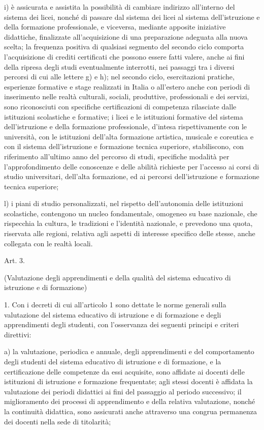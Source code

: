 i) è assicurata e assistita la possibilità di cambiare indirizzo all'interno del sistema dei licei, nonché di passare dal sistema dei licei al sistema dell'istruzione e della formazione professionale, e viceversa, mediante apposite iniziative didattiche, finalizzate all'acquisizione di una preparazione adeguata alla nuova scelta; la frequenza positiva di qualsiasi segmento del secondo ciclo comporta l'acquisizione di crediti certificati che possono essere fatti valere, anche ai fini della ripresa degli studi eventualmente interrotti, nei passaggi tra i diversi percorsi di cui alle lettere g) e h); nel secondo ciclo, esercitazioni pratiche, esperienze formative e stage realizzati in Italia o all'estero anche con periodi di inserimento nelle realtà culturali, sociali, produttive, professionali e dei servizi, sono riconosciuti con specifiche certificazioni di competenza rilasciate dalle istituzioni scolastiche e formative; i licei e le istituzioni formative del sistema dell'istruzione e della formazione professionale, d'intesa rispettivamente con le università, con le istituzioni dell'alta formazione artistica, musicale e coreutica e con il sistema dell'istruzione e formazione tecnica superiore, stabiliscono, con riferimento all'ultimo anno del percorso di studi, specifiche modalità per l'approfondimento delle conoscenze e delle abilità richieste per l'accesso ai corsi di studio universitari, dell'alta formazione, ed ai percorsi dell'istruzione e formazione tecnica superiore;

l) i piani di studio personalizzati, nel rispetto dell'autonomia delle istituzioni scolastiche, contengono un nucleo fondamentale, omogeneo su base nazionale, che rispecchia la cultura, le tradizioni e l'identità nazionale, e prevedono una quota, riservata alle regioni, relativa agli aspetti di interesse specifico delle stesse, anche collegata con le realtà locali.

Art. 3.

(Valutazione degli apprendimenti e della qualità del sistema educativo di istruzione e di formazione)

1. Con i decreti di cui all'articolo 1 sono dettate le norme generali sulla valutazione del sistema educativo di istruzione e di formazione e degli apprendimenti degli studenti, con l'osservanza dei seguenti principi e criteri direttivi:

a) la valutazione, periodica e annuale, degli apprendimenti e del comportamento degli studenti del sistema educativo di istruzione e di formazione, e la certificazione delle competenze da essi acquisite, sono affidate ai docenti delle istituzioni di istruzione e formazione frequentate; agli stessi docenti è affidata la valutazione dei periodi didattici ai fini del passaggio al periodo successivo; il miglioramento dei processi di apprendimento e della relativa valutazione, nonché la continuità didattica, sono assicurati anche attraverso una congrua permanenza dei docenti nella sede di titolarità;

